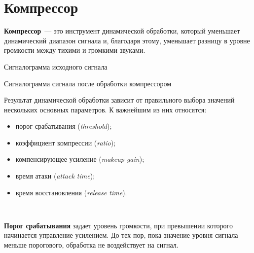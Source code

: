 \documentclass{beamer}
\begin{document}
\section{Компрессор}
\begin{frame}
  \textbf{Компрессор}~--- это инструмент динамической обработки, который уменьшает динамический диапазон сигнала и, благодаря этому, уменьшает разницу в уровне  громкости между тихими и громкими звуками.

  \begin{block}{Сигналограмма исходного сигнала}
  \end{block}

  \begin{block}{Сигналограмма сигнала после обработки компрессором}
  \end{block}
\end{frame}

\begin{frame}
  Результат динамической обработки зависит от правильного выбора значений нескольких основных параметров. К важнейшим из них относятся:
  \begin{itemize}
    \item порог срабатывания (\emph{threshold});
    \item коэффициент компрессии (\emph{ratio});
    \item компенсирующее усиление (\emph{makeup gain});
    \item время атаки (\emph{attack time});
    \item время восстановления (\emph{release time}).
  \end{itemize}

  ~

  \textbf{Порог срабатывания} задает уровень громкости, при превышении которого начинается управление усилением. До тех пор, пока значение уровня сигнала меньше порогового, обработка не воздействует на сигнал.
\end{frame}
\end{document}

